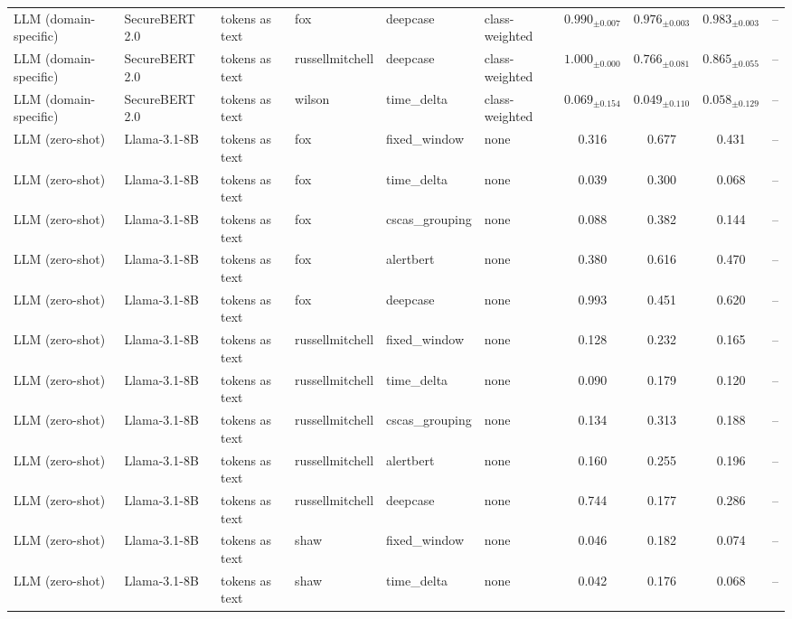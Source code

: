 \begin{longtable}{llllllcccc}
\addlinespace
LLM (domain-specific) & SecureBERT 2.0 & tokens as text & fox & deepcase & class-weighted & $0.990_{\pm 0.007}$ & $0.976_{\pm 0.003}$ & $0.983_{\pm 0.003}$ & -- \\
\addlinespace
LLM (domain-specific) & SecureBERT 2.0 & tokens as text & russellmitchell & deepcase & class-weighted & $1.000_{\pm 0.000}$ & $0.766_{\pm 0.081}$ & $0.865_{\pm 0.055}$ & -- \\
\addlinespace
LLM (domain-specific) & SecureBERT 2.0 & tokens as text & wilson & time\_delta & class-weighted & $0.069_{\pm 0.154}$ & $0.049_{\pm 0.110}$ & $0.058_{\pm 0.129}$ & -- \\
\addlinespace
LLM (zero-shot) & Llama-3.1-8B & tokens as text & fox & fixed\_window & none & 0.316 & 0.677 & 0.431 & -- \\
\addlinespace
LLM (zero-shot) & Llama-3.1-8B & tokens as text & fox & time\_delta & none & 0.039 & 0.300 & 0.068 & -- \\
\addlinespace
LLM (zero-shot) & Llama-3.1-8B & tokens as text & fox & cscas\_grouping & none & 0.088 & 0.382 & 0.144 & -- \\
\addlinespace
LLM (zero-shot) & Llama-3.1-8B & tokens as text & fox & alertbert & none & 0.380 & 0.616 & 0.470 & -- \\
\addlinespace
LLM (zero-shot) & Llama-3.1-8B & tokens as text & fox & deepcase & none & 0.993 & 0.451 & 0.620 & -- \\
\addlinespace
LLM (zero-shot) & Llama-3.1-8B & tokens as text & russellmitchell & fixed\_window & none & 0.128 & 0.232 & 0.165 & -- \\
\addlinespace
LLM (zero-shot) & Llama-3.1-8B & tokens as text & russellmitchell & time\_delta & none & 0.090 & 0.179 & 0.120 & -- \\
\addlinespace
LLM (zero-shot) & Llama-3.1-8B & tokens as text & russellmitchell & cscas\_grouping & none & 0.134 & 0.313 & 0.188 & -- \\
\addlinespace
LLM (zero-shot) & Llama-3.1-8B & tokens as text & russellmitchell & alertbert & none & 0.160 & 0.255 & 0.196 & -- \\
\addlinespace
LLM (zero-shot) & Llama-3.1-8B & tokens as text & russellmitchell & deepcase & none & 0.744 & 0.177 & 0.286 & -- \\
\addlinespace
LLM (zero-shot) & Llama-3.1-8B & tokens as text & shaw & fixed\_window & none & 0.046 & 0.182 & 0.074 & -- \\
\addlinespace
LLM (zero-shot) & Llama-3.1-8B & tokens as text & shaw & time\_delta & none & 0.042 & 0.176 & 0.068 & -- \\

\end{longtable}
